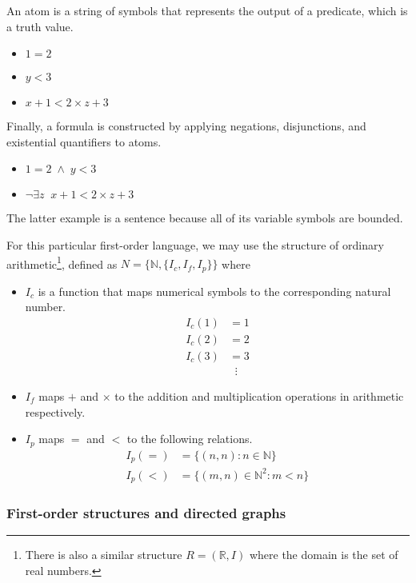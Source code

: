 An atom is a string of symbols that represents the output of a predicate, which is a truth value.
%
\begin{itemize}
    \item \(1 = 2\)
    \item \(y < 3\)
    \item \(x + 1 < 2 \times z + 3\)
\end{itemize}
%
Finally, a formula is constructed by applying negations, disjunctions, and existential quantifiers to atoms.
%
\begin{itemize}
    \item \(1 = 2 \;\land\; y < 3\)
    \item \(\neg \exists z\;\; x + 1 < 2 \times z + 3\)
\end{itemize}
%
The latter example is a sentence because all of its variable symbols are bounded.

For this particular first-order language, we may use the structure of ordinary arithmetic\footnote{There is also a similar structure \(R = (\mathbb{R}, I)\) where the domain is the set of real numbers.}, defined as \(N = \{\mathbb{N}, \{I_c, I_f, I_p\}\}\) where
%
\begin{itemize}
    \item \(I_c\) is a function that maps numerical symbols to the corresponding natural number.
    \begin{align*}
        I_c (1) &= 1\\
        I_c (2) &= 2\\
        I_c (3) &= 3\\
        &\;\;\vdots
    \end{align*}

    \item \(I_f\) maps \(+\) and \(\times\) to the addition and multiplication operations in arithmetic respectively.
    
    \item \(I_p\) maps \(=\) and \(<\) to the following relations.
    \begin{align*}
        I_p (=) &= \{(n, n) : n \in \mathbb{N}\}\\
        I_p (<) &= \{(m, n) \in \mathbb{N}^2 : m < n\}
    \end{align*}
\end{itemize}



\subsubsection{First-order structures and directed graphs}

